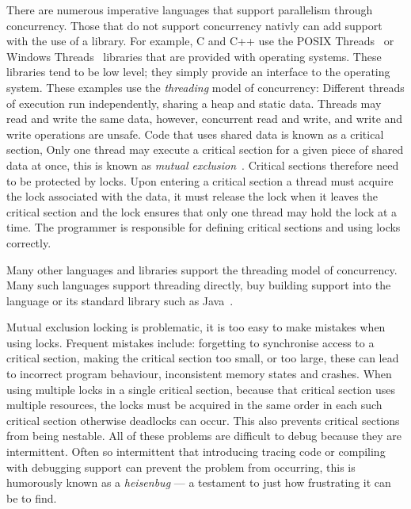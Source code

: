 There are numerous imperative languages that support parallelism through
concurrency.
Those that do not support concurrency nativly can add support
with the use of a library.
For example, 
C and C++ use the POSIX Threads~\citep{butenhof1997:pthreads} or Windows
Threads~\citep{winthreads} libraries that are provided with operating systems.
These libraries tend to be low level;
they simply provide an interface to the operating system.
These examples use the \emph{threading} model of concurrency:
Different threads of execution run independently,
sharing a heap and static data.
Threads may read and write the same data,
however,
concurrent read and write, and write and write operations are unsafe.
Code that uses shared data is known as a critical section,
Only one thread may execute a critical section for a given piece of shared data
at once,
this is known as \emph{mutual exclusion}~\citep{Dijkstra:Mutex}.
Critical sections therefore need to be protected by locks.
Upon entering a critical section a thread must acquire the lock associated with
the data,
it must release the lock when it leaves the critical section and the lock
ensures that only one thread may hold the lock at a time.
The programmer is responsible for defining critical sections and using locks
correctly.

Many other languages and libraries support the threading model of concurrency.
Many such languages support threading directly, buy building support into the
language or its standard library such as Java~\citep{java-threads}.

Mutual exclusion locking is problematic,
it is too easy to make mistakes when using locks.
Frequent mistakes include: forgetting to synchronise access to a critical
section,
making the critical section too small, or too large,
these can lead to incorrect program behaviour, inconsistent memory states and
crashes. 
When using multiple locks in a single critical section,
because that critical section uses multiple resources,
the locks must be acquired in the same order in each such critical section
otherwise deadlocks can occur.
This also prevents critical sections from being nestable.
All of these problems are difficult to debug because they are intermittent.
Often so intermittent that introducing tracing code or compiling with debugging
support can prevent the problem from occurring,
this is humorously known as a \emph{heisenbug} ---
a testament to just how frustrating it can be to find.


